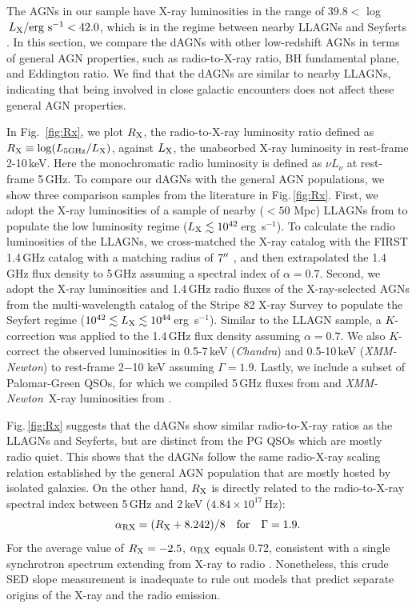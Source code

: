 \documentclass[iop,revtex4,twocolumn,apj,numberedappendix,appendixfloats]{emulateapj}
\newcommand{\ergs}{erg~s$^{-1}$}
\newcommand{\chandra}{{\it Chandra}}
\newcommand{\xmm}{{\it XMM-Newton}}
\begin{document}
The AGNs in our sample have X-ray luminosities in the range of $39.8 <$ log$\,L_{\rm X}/{\rm erg~s}^{-1} < 42.0$, which is in the regime between nearby LLAGNs and Seyferts \citep{Ho08}. In this section, we compare the dAGNs with other low-redshift AGNs in terms of general AGN properties, such as radio-to-X-ray ratio, BH fundamental plane, and Eddington ratio. We find that the dAGNs are similar to nearby LLAGNs, indicating that being involved in close galactic encounters does not affect these general AGN properties. 

In Fig.~\ref{fig:Rx}, we plot $R_{\rm X}$, the radio-to-X-ray luminosity ratio defined as $R_{\rm X} \equiv \log(L_{\rm 5GHz}/L_{\rm X})$, against $L_{\rm X}$, the unabsorbed X-ray luminosity in rest-frame 2-10\,keV. Here the monochromatic radio luminosity is defined as $\nu L_\nu$ at rest-frame 5\,GHz.
%
To compare our dAGNs with the general AGN populations, we show three comparison samples from the literature in Fig.\,\ref{fig:Rx}.
%  
First, we adopt the X-ray luminosities of a sample of nearby ($< 50$ Mpc) LLAGNs from \citet{She17} to populate the low luminosity regime ($L_{\rm X} \lesssim 10^{42}$\,\ergs). To calculate the radio luminosities of the LLAGNs, we cross-matched the X-ray catalog with the FIRST 1.4\,GHz catalog \citep{Helfand15} with a matching radius of $7\mbox{$^{\prime\prime}$}$ \citep{Lamassa16}, and then extrapolated the 1.4\,GHz flux density to 5\,GHz assuming a spectral index of $\alpha = 0.7$. 
%
Second, we adopt the X-ray luminosities and 1.4\,GHz radio fluxes of the X-ray-selected AGNs from the multi-wavelength catalog of the Stripe 82 X-ray Survey \citep{Lamassa16} to populate the Seyfert regime ($10^{42} \lesssim L_{\rm X} \lesssim 10^{44}$\,\ergs). Similar to the LLAGN sample, a $K$-correction was applied to the 1.4\,GHz flux density assuming $\alpha = 0.7$. We also $K$-correct the observed luminosities in 0.5-7\,keV (\chandra) and 0.5-10\,keV (\xmm) to rest-frame 2$-$10 keV assuming $\Gamma = 1.9$.
%
Lastly, we include a subset of Palomar-Green QSOs, for which we compiled 5\,GHz fluxes from \citet{Kellermann89} and \xmm\ X-ray luminosities from \citet{Piconcelli05}. 

Fig.\,\ref{fig:Rx} suggests that the dAGNs show similar radio-to-X-ray ratios as the LLAGNs and Seyferts, but are distinct from the PG QSOs which are mostly radio quiet. This shows that the dAGNs follow the same radio-X-ray scaling relation established by the general AGN population that are mostly hosted by isolated galaxies. On the other hand, $R_{\rm X}$ is directly related to the radio-to-X-ray spectral index between 5\,GHz and 2\,keV ($4.84\times10^{17}$\,Hz):
\begin{equation}
 \alpha_{\rm RX} = (R_{\rm X}+8.242)/8 ~~~{\rm for}~~~ \Gamma = 1.9.
\end{equation}
For the average value of $R_{\rm X} = -2.5$, $\alpha_{\rm RX}$ equals 0.72, consistent with a single synchrotron spectrum extending from X-ray to radio \citep[e.g.,][]{Hardcastle01}. Nonetheless, this crude SED slope measurement is inadequate to rule out models that predict separate origins of the X-ray and the radio emission. 
\end{document}
